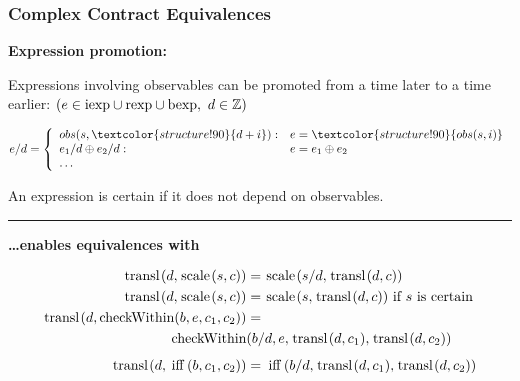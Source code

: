 \documentclass[xcolor=dvipsnames,11pt]{beamer}
\renewcommand{\emph}[1]{\textcolor{structure!90}{#1}}
\newcommand{\ttt}[1]{\mbox{\cd{#1}}}
\newcommand{\scale}{\ttt{scale}}
\newcommand{\transl}{\ttt{transl}}
\newcommand{\ifff}{\ttt{iff}}
\newcommand{\checkWithin}{\ttt{checkWithin}}
\begin{document}
\begin{frame}[t] \frametitle{Complex Contract Equivalences}

\emph{\textbf{Expression promotion:}}

Expressions involving observables can be \emph{promoted} from a time later to a time earlier:
%
\hfill {\footnotesize $(e \in \ttt{iexp} \cup \ttt{rexp} \cup \ttt{bexp},\ d \in \mathbb{Z})$}

{\footnotesize 
$$ e / d = \left \{
\begin{array}{ll}
obs(s,\emph{d+i}) :& e = \emph{obs(s,i)}\\
e_1/d \oplus e_2/d :& e = e_1 \oplus e_2\\
\ldots
\end{array}
\right .$$
}

An expression is \emph{certain} if it does not depend on observables.
\medskip

\hrule
\medskip

\emph{\textbf{\ldots enables equivalences with }}

{\footnotesize
\begin{align*}
    \transl(d,\scale(s,c))       &=  \scale(s/d,\transl(d,c))\\
    \transl(d,\scale(s,c))       &=  \scale(s,\transl(d,c))\  \mbox{if } s \mbox{ is certain}\\
%
  \transl(d,\checkWithin (b, e, c_1, c_2))  &=  \\
                             \checkWithin &(b/d, e, \transl(d,c_1), \transl(d,c_2))\\[1ex]
  \transl(d,\ifff(b,c_1,c_2))  &=  \ifff(b/d, \transl(d,c_1), \transl(d,c_2))\\
\end{align*}
}

\end{frame}

\newcommand{\crule}[3]{\frac{#2}{#3}\ \mbox{\scriptsize \it #1}}
\newcommand{\sem}[1]{[\![#1]\!]}
\newcommand{\csem}[3]{\mathcal{C}\sem{#1}#2 & = #3}
\end{document}
